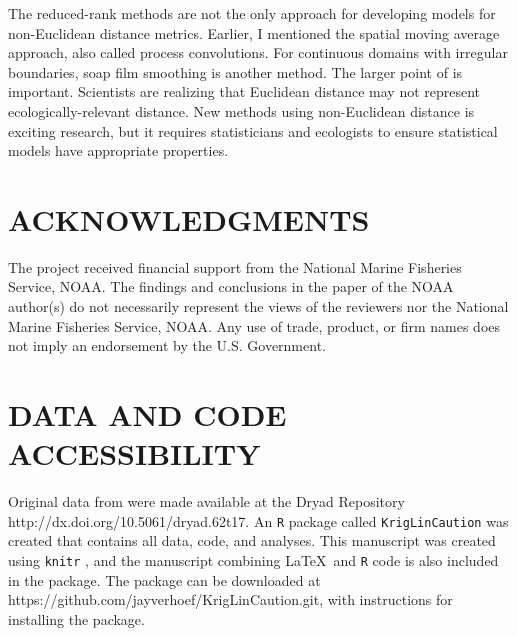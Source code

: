 \documentclass[11pt, titlepage]{article}\usepackage[]{graphicx}\usepackage[]{color}
\begin{document}
\begin{spacing}{1.9}
\begin{flushleft}
The reduced-rank methods are not the only approach for developing models for non-Euclidean distance metrics.  Earlier, I mentioned the spatial moving average approach, also called process convolutions.  For continuous domains with irregular boundaries, soap film smoothing \citep{Wood:Brav:Hedl:soap:2008} is another method. The larger point of \citet{Ladl:Avga:Whea:Boyc:pred:2016} is important. Scientists are realizing that Euclidean distance may not represent ecologically-relevant distance.  New methods using non-Euclidean distance is exciting research, but it requires statisticians and ecologists to ensure statistical models have appropriate properties. 

\section*{ACKNOWLEDGMENTS} 

The project received financial support from the National Marine Fisheries Service, NOAA. The findings and conclusions in the paper of the NOAA author(s) do not necessarily represent the views of the reviewers nor the National Marine Fisheries Service, NOAA. Any use of trade, product, or firm names does not imply an endorsement by the U.S. Government. 

\section*{DATA AND CODE ACCESSIBILITY}

Original data from \citet{Ladl:Avga:Whea:Boyc:pred:2016} were made available at the Dryad Repository http://dx.doi.org/10.5061/dryad.62t17. An \texttt{R} \citep{R:Deve:Core:ALan:2017} package called \texttt{KrigLinCaution} was created that contains all data, code, and analyses. This manuscript was created using \texttt{knitr} \citep{Yihu:impl:2014,Yihu:dyna:2015,Yihu:knit:2016}, and the manuscript combining \LaTeX\ and \texttt{R} code is also included in the package.  The package can be downloaded at https://github.com/jayverhoef/KrigLinCaution.git, with instructions for installing the package.

	


%
%





\end{flushleft}
\end{spacing}
\end{document}
